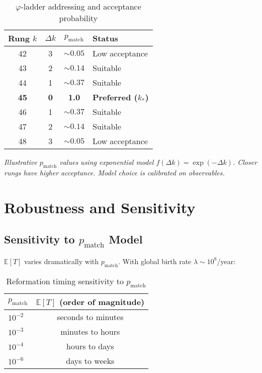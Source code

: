\documentclass[11pt,letterpaper]{article}
\theoremstyle{definition}
\theoremstyle{remark}
\begin{document}
\begin{table}[ht]
\centering
\caption{\(\varphi\)-ladder addressing and acceptance probability}
\label{tab:ladder}
\begin{tabular}{cccl}
\toprule
\textbf{Rung \(k\)} & \textbf{\(\Delta k\)} & \textbf{\(p_{\text{match}}\)} & \textbf{Status} \\
\midrule
42 & 3 & \(\sim\!0.05\) & Low acceptance \\
43 & 2 & \(\sim\!0.14\) & Suitable \\
44 & 1 & \(\sim\!0.37\) & Suitable \\
\textbf{45} & \textbf{0} & \textbf{1.0} & \textbf{Preferred (\(k_*\))} \\
46 & 1 & \(\sim\!0.37\) & Suitable \\
47 & 2 & \(\sim\!0.14\) & Suitable \\
48 & 3 & \(\sim\!0.05\) & Low acceptance \\
\bottomrule
\end{tabular}

\medskip

\small\emph{Illustrative \(p_{\text{match}}\) values using exponential model \(f(\Delta k)=\exp(-\Delta k)\). Closer rungs have higher acceptance. Model choice is calibrated on observables.}
\end{table}

\section{Robustness and Sensitivity}\label{app:robustness}

\subsection{Sensitivity to \texorpdfstring{\(p_{\text{match}}\)}{p\_match} Model}

\(\mathbb{E}[T]\) varies dramatically with \(p_{\text{match}}\). With global birth rate \(\lambda\sim 10^8\)/year:

\begin{table}[ht]
\centering
\caption{Reformation timing sensitivity to \(p_{\text{match}}\)}
\label{tab:sensitivity}
\begin{tabular}{lc}
\toprule
\textbf{\(p_{\text{match}}\)} & \textbf{\(\mathbb{E}[T]\) (order of magnitude)} \\
\midrule
\(10^{-2}\) & seconds to minutes \\
\(10^{-3}\) & minutes to hours \\
\(10^{-4}\) & hours to days \\
\(10^{-6}\) & days to weeks \\
\bottomrule
\end{tabular}
\end{table}
\end{document}
